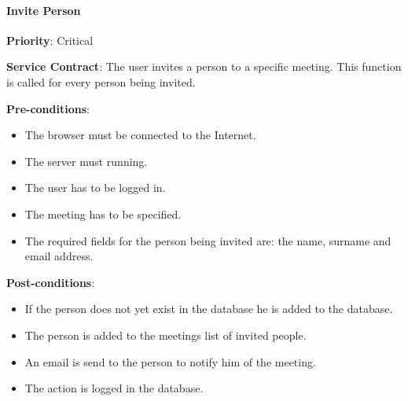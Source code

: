     	\paragraph{Invite Person}
			\begin{description}
			    \item{\textbf{Priority}:} Critical
			    \item{\textbf{Service Contract}:} The user invites a person to a specific meeting. This function is called for every person being invited.
			    \item{\textbf{Pre-conditions}:}
    			    \begin{itemize}
    			        \item The browser must be connected to the Internet.
    			        \item The server must running.	        
    			        \item The user has to be logged in. 
    			        \item The meeting has to be specified.
    			        \item The required fields for the person being invited are: the name, surname and email address.
    			    \end{itemize}
			    \item{\textbf{Post-conditions}:} 
    			    \begin{itemize}
    			      \item If the person does not yet exist in the database he is added to the database.
    			      \item The person is added to the meetings list of invited people. 
    			      \item An email is send to the person to notify him of the meeting.
    			      \item The action is logged in the database.
    			    \end{itemize}
			\end{description}	
			
